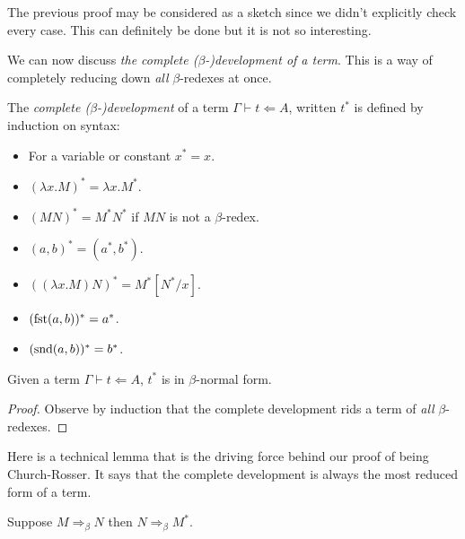 \begin{remark}
    The previous proof may be considered as a sketch since we didn't explicitly check every case. This can definitely be done but it is not so interesting.
\end{remark}

We can now discuss \emph{the complete ($\beta$-)development of a term}. This is a way of completely reducing down \emph{all} $\beta$-redexes at once.

\begin{defin}
    The \emph{complete ($\beta$-)development} of a term $\Gamma \vdash t \Leftarrow A$, written $t^*$ is defined by induction on syntax:
    \begin{itemize}
        \item For a variable or constant $x^* = x$.
        \item $(\lambda x . M)^* = \lambda x . M^*$.
        \item $(M N)^* = M^* N^*$ if $MN$ is not a $\beta$-redex.
        \item $(a, b)^* = (a^*, b^*)$.
        \item $((\lambda x . M)N)^* = M^* [N^* / x]$.
        \item $(\mathrm{fst} (a, b))^* = a^*$.
        \item $(\mathrm{snd} (a, b))^* = b^*$.
    \end{itemize}
\end{defin}

\begin{lemma}
    Given a term $\Gamma \vdash t \Leftarrow A$, $t^*$ is in $\beta$-normal form.
\end{lemma}

\begin{proof}
    Observe by induction that the complete development rids a term of \emph{all} $\beta$-redexes.
\end{proof}


Here is a technical lemma that is the driving force behind our proof of being Church-Rosser. It says that the complete development is always the most reduced form of a term.

\begin{lemma}\label{cd_lemma_beta}
    Suppose $M \Rightarrow_\beta N$ then $N \Rightarrow_\beta M^*$.
\end{lemma}

